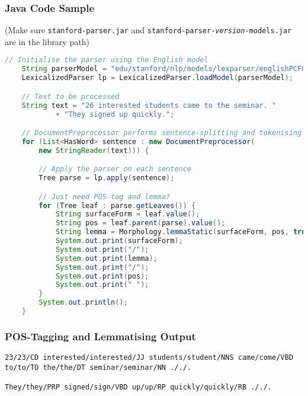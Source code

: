 \begin{frame}
\frametitle{Java Code Sample}

(\small Make sure \texttt{stanford-parser.jar} and \texttt{stanford-parser-\emph{version}-models.jar} are in the library path)


\begin{lstlisting}[language=Java,basicstyle={\ttfamily\footnotesize}, gobble=4,
    morekeywords={String, LexicalizedParser, List,DocumentPreprocessor,Tree,HasWord,Morphology,StringReader},
    emph={apply,getLeaves,value,parent,lemmaStatic}, frame=lines,
    escapechar=|]
    // Initialise the parser using the English model
    String parserModel = "edu/stanford/nlp/models/lexparser/englishPCFG.ser.gz";
    LexicalizedParser lp = LexicalizedParser.loadModel(parserModel);

    // Text to be processed
    String text = "26 interested students came to the seminar. " 
            + "They signed up quickly.";

    // DocumentPreprocessor performs sentence-splitting and tokenising
    for (List<HasWord> sentence : new DocumentPreprocessor(
        new StringReader(text))) {

        // Apply the parser on each sentence
        Tree parse = lp.apply(sentence);

        // Just need POS-tag and lemma?
        for (Tree leaf : parse.getLeaves()) {
            String surfaceForm = leaf.value();
            String pos = leaf.parent(parse).value();
            String lemma = Morphology.lemmaStatic(surfaceForm, pos, true);
            System.out.print(surfaceForm);
            System.out.print("/");
            System.out.print(lemma);
            System.out.print("/");
            System.out.print(pos);
            System.out.print(" ");
        }
        System.out.println();
    }
\end{lstlisting}

\end{frame}

\begin{frame}[fragile]
\frametitle{POS-Tagging and Lemmatising Output}
    
\begin{lstlisting}
23/23/CD interested/interested/JJ students/student/NNS came/come/VBD to/to/TO the/the/DT seminar/seminar/NN ././. 

They/they/PRP signed/sign/VBD up/up/RP quickly/quickly/RB ././. 
\end{lstlisting}

\end{frame}


